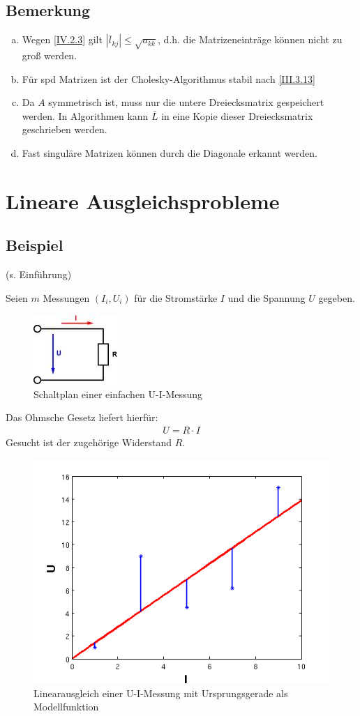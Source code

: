 \documentclass[ngerman,fontsize=11pt, paper=a4, parskip=half, titlepage=true, toc=bib]{scrbook}
\newcommand{\sectione}[1]{\section{#1} \setcounter{equation}{0}}
\begin{document}
		\subsection{Bemerkung}
		\begin{enumerate}[a)]
			\item Wegen \eqref{IV.2.3} gilt $|\overline{l}_{kj}| \leq \sqrt{a_{kk}}$,
						d.h. die Matrizeneinträge können nicht zu groß werden.
			\item Für spd Matrizen ist der Cholesky-Algorithmus stabil nach \eqref{III.3.13}
			\item Da $A$ symmetrisch ist, muss nur die untere Dreiecksmatrix gespeichert werden.
				       In Algorithmen kann $\bar{L}$ in eine Kopie dieser Dreiecksmatrix geschrieben werden.
			\item Fast singuläre Matrizen können durch die Diagonale erkannt werden.
		\end{enumerate}
		
		
	\sectione{Lineare Ausgleichsprobleme} 
	
	\subsection{Beispiel}
	(s. Einführung)
	
	Seien $m$ Messungen $(I_i, U_i)$ für die Stromstärke $I$ und die Spannung $U$ gegeben. \\
	
		  \begin{figure}
		  	\parbox{\linewidth}{
		  		\centering
		  		\includegraphics{images/ohmsche.jpeg}
		  	}
		  	\caption{Schaltplan einer einfachen U-I-Messung}
		  \end{figure}
		  
		
	Das Ohmsche Gesetz liefert hierfür:
	\begin{gather*}
		U=R\cdot I
	\end{gather*}
	Gesucht ist der zugehörige Widerstand $R$.\\
	
			  \begin{figure}
			  	\parbox{\linewidth}{
			  		\centering
			  		\includegraphics[width=0.5\linewidth]{images/linausgl2.png}
			  	}
			  	\caption{Linearausgleich einer U-I-Messung mit Ursprungsgerade als Modellfunktion}
			  \end{figure}
	
\end{document}
